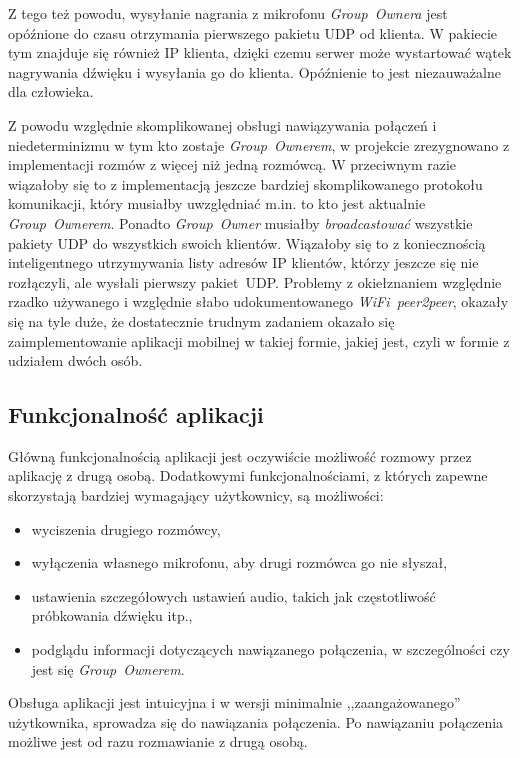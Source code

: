 \documentclass[a4paper,titlepage]{article}
\theoremstyle{break}
\begin{document}
Z tego też powodu, wysyłanie nagrania z mikrofonu \emph{Group~Ownera} jest opóźnione do czasu otrzymania pierwszego pakietu UDP od klienta. W pakiecie tym znajduje się również IP klienta, dzięki czemu serwer może wystartować wątek nagrywania dźwięku i wysyłania go do klienta. Opóźnienie to jest niezauważalne dla człowieka.

Z powodu względnie skomplikowanej obsługi nawiązywania połączeń i niedeterminizmu w tym kto zostaje \emph{Group~Ownerem}, w projekcie zrezygnowano z implementacji rozmów z więcej niż jedną rozmówcą. W przeciwnym razie wiązałoby się to z implementacją jeszcze bardziej skomplikowanego protokołu komunikacji, który musiałby uwzględniać m.in. to kto jest aktualnie \emph{Group~Ownerem}. Ponadto \emph{Group~Owner} musiałby \emph{broadcastować} wszystkie pakiety UDP do wszystkich swoich klientów. Wiązałoby się to z koniecznością inteligentnego utrzymywania listy adresów IP klientów, którzy jeszcze się nie rozłączyli, ale wysłali pierwszy pakiet~UDP. Problemy z okiełznaniem względnie rzadko używanego i względnie słabo udokumentowanego \emph{WiFi~peer2peer}, okazały się na tyle duże, że dostatecznie trudnym zadaniem okazało się zaimplementowanie aplikacji mobilnej w takiej formie, jakiej jest, czyli w formie z udziałem dwóch osób.


\subsection{Funkcjonalność aplikacji}

Główną funkcjonalnością aplikacji jest oczywiście możliwość rozmowy przez aplikację z drugą osobą. Dodatkowymi funkcjonalnościami, z których zapewne skorzystają bardziej wymagający użytkownicy, są możliwości:
\begin{itemize}
	\item wyciszenia drugiego rozmówcy,
	\item wyłączenia własnego mikrofonu, aby drugi rozmówca go nie słyszał,
	\item ustawienia szczegółowych ustawień audio, takich jak częstotliwość próbkowania dźwięku itp.,
	\item podglądu informacji dotyczących nawiązanego połączenia, w szczególności czy jest się \emph{Group~Ownerem}.
\end{itemize}
Obsługa aplikacji jest intuicyjna i w wersji minimalnie ,,zaangażowanego'' użytkownika, sprowadza się do nawiązania połączenia. Po nawiązaniu połączenia możliwe jest od razu rozmawianie z drugą osobą.
\end{document}
